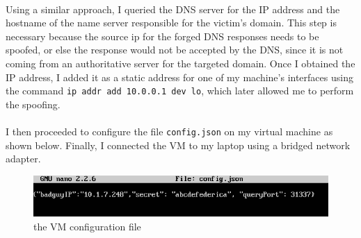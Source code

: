 \documentclass[a4paper]{article}
\begin{document}
	\\Using a similar approach, I queried the DNS server for the IP address and the hostname of the name server responsible for the victim's domain. This step is necessary because the source ip for the forged DNS responses needs to be spoofed, or else the response would not be accepted by the DNS, since it is not coming from an authoritative server for the targeted domain.
	Once I obtained the IP address, I added it as a static address for one of my machine's interfaces using the command \texttt{ip addr add 10.0.0.1 dev lo}, which later allowed me to perform the spoofing.
	\\\\I then proceeded to configure the file \texttt{config.json} on my virtual machine as shown below. Finally, I connected the VM to my laptop using a bridged network adapter.\\
	\begin{figure}[H]
		\centering
		\includegraphics[width=1\linewidth]{config_json}
		\caption{the VM configuration file}
		\label{fig:configjson}
	\end{figure}
	
\end{document}
